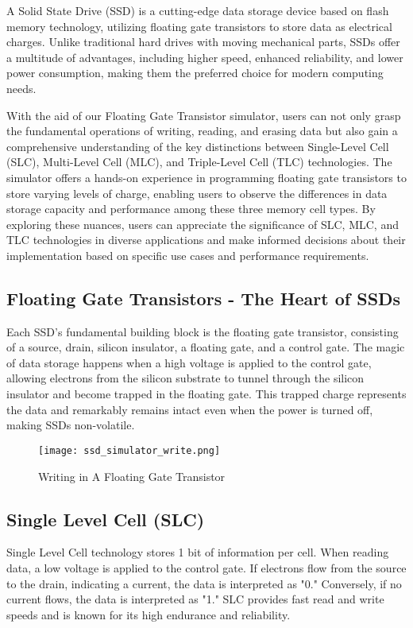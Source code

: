 \documentclass[conference]{IEEEtran}
\begin{document}
A Solid State Drive (SSD) is a cutting-edge data storage device based on flash memory technology, utilizing floating gate transistors to store data as electrical charges. Unlike traditional hard drives with moving mechanical parts, SSDs offer a multitude of advantages, including higher speed, enhanced reliability, and lower power consumption, making them the preferred choice for modern computing needs.

With the aid of our Floating Gate Transistor simulator, users can not only grasp the fundamental operations of writing, reading, and erasing data but also gain a comprehensive understanding of the key distinctions between Single-Level Cell (SLC), Multi-Level Cell (MLC), and Triple-Level Cell (TLC) technologies. The simulator offers a hands-on experience in programming floating gate transistors to store varying levels of charge, enabling users to observe the differences in data storage capacity and performance among these three memory cell types. By exploring these nuances, users can appreciate the significance of SLC, MLC, and TLC technologies in diverse applications and make informed decisions about their implementation based on specific use cases and performance requirements.

\subsection{Floating Gate Transistors - The Heart of SSDs}
Each SSD's fundamental building block is the floating gate transistor, consisting of a source, drain, silicon insulator, a floating gate, and a control gate. The magic of data storage happens when a high voltage is applied to the control gate, allowing electrons from the silicon substrate to tunnel through the silicon insulator and become trapped in the floating gate. This trapped charge represents the data and remarkably remains intact even when the power is turned off, making SSDs non-volatile.
\begin{figure}[h]
    \centering
    \texttt{[image: ssd\_simulator\_write.png]}
    \caption{Writing in A Floating Gate Transistor}
    \label{fig:ssd_simulator_write}
\end{figure}
\subsection{Single Level Cell (SLC)}
Single Level Cell technology stores 1 bit of information per cell. When reading data, a low voltage is applied to the control gate. If electrons flow from the source to the drain, indicating a current, the data is interpreted as "0." Conversely, if no current flows, the data is interpreted as "1." SLC provides fast read and write speeds and is known for its high endurance and reliability.
\end{document}
